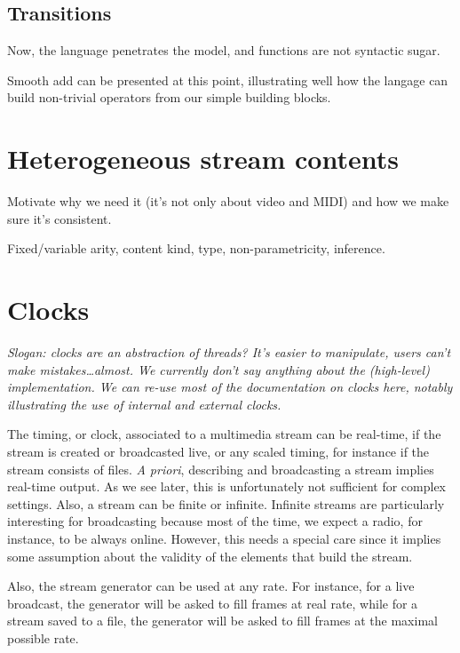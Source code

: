 \documentclass{llncs}
\begin{document}
\subsection{Transitions}

Now, the language penetrates the model, and functions are not syntactic sugar.

Smooth add can be presented at this point,
illustrating well how the langage can build non-trivial operators from
our simple building blocks.

\section{Heterogeneous stream contents} \label{sec:content}

Motivate why we need it (it's not only about video and MIDI)
and how we make sure it's consistent.

Fixed/variable arity, content kind, type, non-parametricity, inference.

\section{Clocks}

\emph{Slogan: clocks are an abstraction of threads?
  It's easier to manipulate, users can't make mistakes\ldots almost.
  We currently don't say anything about the (high-level) implementation.
  We can re-use most of the documentation on clocks here,
  notably illustrating the use of internal and external clocks.}


The timing, or clock, associated to a multimedia stream can be real-time, if the stream is created 
or broadcasted live, or any scaled timing, for instance if the stream consists of files. \textit{A priori},
describing and broadcasting a stream implies real-time output. As we see later, this is unfortunately 
not sufficient for complex settings.
Also, a stream can be finite or infinite. Infinite streams are particularly interesting for broadcasting
because most of the time, we expect a radio, for instance, to be always online. However, this needs 
a special care since it implies some assumption about the validity of the elements that build the stream.

Also, the stream generator can be used at any rate. For instance,
for a live broadcast, the generator will be asked to fill frames at real rate, while 
for a stream saved to a file, the generator will be asked to fill frames at the maximal possible rate.
\end{document}
